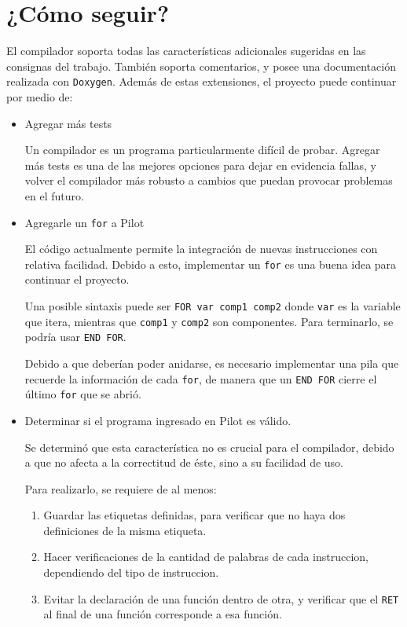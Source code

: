 \documentclass[12pt,spanish]{article}
\begin{document}
\section{¿Cómo seguir?}
El compilador soporta todas las características adicionales sugeridas en las consignas del trabajo. También soporta comentarios, y posee una documentación realizada con \texttt{Doxygen}.
Además de estas extensiones, el proyecto puede continuar por medio de:
\begin{itemize}
\item{Agregar más tests}

Un compilador es un programa particularmente difícil de probar. Agregar más tests es una de las mejores opciones para dejar en evidencia fallas, y volver el compilador más robusto a cambios que puedan provocar problemas en el futuro.

\item{Agregarle un \texttt{for} a Pilot}

El código actualmente permite la integración de nuevas instrucciones con relativa facilidad. Debido a esto, implementar un \texttt{for} es una buena idea para continuar el proyecto. 

Una posible sintaxis puede ser \texttt{FOR var comp1 comp2} donde \texttt{var} es la variable que itera, mientras que \texttt{comp1} y \texttt{comp2} son componentes. Para terminarlo, se podría usar \texttt{END FOR}.

Debido a que deberían poder anidarse, es necesario implementar una pila que recuerde la información de cada \texttt{for}, de manera que un \texttt{END FOR} cierre el último \texttt{for} que se abrió.

\item{Determinar si el programa ingresado en Pilot es válido.}

Se determinó que esta característica no es crucial para el compilador, debido a que no afecta a la correctitud de éste, sino a su facilidad de uso.

Para realizarlo, se requiere de al menos:
\begin{enumerate}
\item{Guardar las etiquetas definidas, para verificar que no haya dos definiciones de la misma etiqueta.}
\item{Hacer verificaciones de la cantidad de palabras de cada instruccion, dependiendo del tipo de instruccion.}
\item{Evitar la declaración de una función dentro de otra, y verificar que el \texttt{RET} al final de una función corresponde a esa función.}
\end{enumerate}


\end{itemize}
\end{document}
